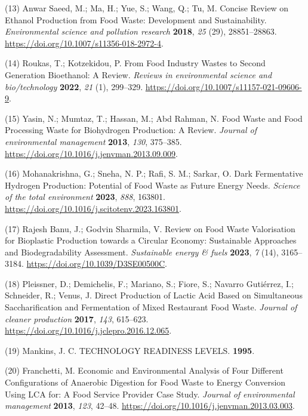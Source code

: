 \documentclass[11pt]{report}
\begin{document}
\hypertarget{citeproc_bib_item_13}{(13) Anwar Saeed, M.; Ma, H.; Yue, S.; Wang, Q.; Tu, M. Concise Review on Ethanol Production from Food Waste: Development and Sustainability. \textit{Environmental science and pollution research} \textbf{2018}, \textit{25} (29), 28851–28863. \url{https://doi.org/10.1007/s11356-018-2972-4}.}

\hypertarget{citeproc_bib_item_14}{(14) Roukas, T.; Kotzekidou, P. From Food Industry Wastes to Second Generation Bioethanol: A Review. \textit{Reviews in environmental science and bio/technology} \textbf{2022}, \textit{21} (1), 299–329. \url{https://doi.org/10.1007/s11157-021-09606-9}.}

\hypertarget{citeproc_bib_item_15}{(15) Yasin, N.; Mumtaz, T.; Hassan, M.; Abd Rahman, N. Food Waste and Food Processing Waste for Biohydrogen Production: A Review. \textit{Journal of environmental management} \textbf{2013}, \textit{130}, 375–385. \url{https://doi.org/10.1016/j.jenvman.2013.09.009}.}

\hypertarget{citeproc_bib_item_16}{(16) Mohanakrishna, G.; Sneha, N. P.; Rafi, S. M.; Sarkar, O. Dark Fermentative Hydrogen Production: Potential of Food Waste as Future Energy Needs. \textit{Science of the total environment} \textbf{2023}, \textit{888}, 163801. \url{https://doi.org/10.1016/j.scitotenv.2023.163801}.}

\hypertarget{citeproc_bib_item_17}{(17) Rajesh Banu, J.; Godvin Sharmila, V. Review on Food Waste Valorisation for Bioplastic Production towards a Circular Economy: Sustainable Approaches and Biodegradability Assessment. \textit{Sustainable energy \& fuels} \textbf{2023}, \textit{7} (14), 3165–3184. \url{https://doi.org/10.1039/D3SE00500C}.}

\hypertarget{citeproc_bib_item_18}{(18) Pleissner, D.; Demichelis, F.; Mariano, S.; Fiore, S.; Navarro Gutiérrez, I.; Schneider, R.; Venus, J. Direct Production of Lactic Acid Based on Simultaneous Saccharification and Fermentation of Mixed Restaurant Food Waste. \textit{Journal of cleaner production} \textbf{2017}, \textit{143}, 615–623. \url{https://doi.org/10.1016/j.jclepro.2016.12.065}.}

\hypertarget{citeproc_bib_item_19}{(19) Mankins, J. C. TECHNOLOGY READINESS LEVELS. \textbf{1995}.}

\hypertarget{citeproc_bib_item_20}{(20) Franchetti, M. Economic and Environmental Analysis of Four Different Configurations of Anaerobic Digestion for Food Waste to Energy Conversion Using LCA for: A Food Service Provider Case Study. \textit{Journal of environmental management} \textbf{2013}, \textit{123}, 42–48. \url{https://doi.org/10.1016/j.jenvman.2013.03.003}.}
\end{document}
